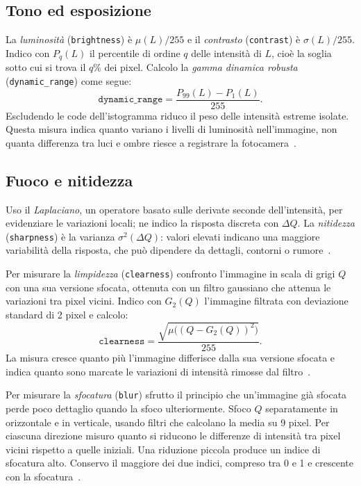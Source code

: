 \subsection{Tono ed esposizione}
\label{subsec:feature-tono}

La \emph{luminosità} (\texttt{brightness}) è $\mu(L)/255$ e il \emph{contrasto} (\texttt{contrast}) è $\sigma(L)/255$. Indico con $P_q(L)$ il percentile di ordine $q$ delle intensità di $L$, cioè la soglia sotto cui si trova il $q\%$ dei pixel. Calcolo la \emph{gamma dinamica robusta} (\texttt{dynamic\_range}) come segue:
\begin{equation}
    \texttt{dynamic\_range}=\frac{P_{99}(L)-P_1(L)}{255}.
    \label{eq:feature-gamma-dinamica}
\end{equation}
Escludendo le code dell'istogramma riduco il peso delle intensità estreme isolate. Questa misura indica quanto variano i livelli di luminosità nell'immagine, non quanta differenza tra luci e ombre riesce a registrare la fotocamera~\cite{1640788}.

\subsection{Fuoco e nitidezza}
\label{subsec:feature-fuoco}

Uso il \emph{Laplaciano}, un operatore basato sulle derivate seconde dell'intensità, per evidenziare le variazioni locali; ne indico la risposta discreta con $\Delta Q$. La \emph{nitidezza} (\texttt{sharpness}) è la varianza $\sigma^2(\Delta Q)$: valori elevati indicano una maggiore variabilità della risposta, che può dipendere da dettagli, contorni o rumore~\cite{903548}.

Per misurare la \emph{limpidezza} (\texttt{clearness}) confronto l'immagine in scala di grigi $Q$ con una sua versione sfocata, ottenuta con un filtro gaussiano che attenua le variazioni tra pixel vicini. Indico con $G_2(Q)$ l'immagine filtrata con deviazione standard di 2 pixel e calcolo:
\begin{equation}
    \texttt{clearness}=\frac{\sqrt{\mu\bigl((Q-G_2(Q))^2\bigr)}}{255}.
    \label{eq:feature-limpidezza}
\end{equation}
La misura cresce quanto più l'immagine differisce dalla sua versione sfocata e indica quanto sono marcate le variazioni di intensità rimosse dal filtro~\cite{PERTUZ20131415}.

Per misurare la \emph{sfocatura} (\texttt{blur}) sfrutto il principio che un'immagine già sfocata perde poco dettaglio quando la sfoco ulteriormente. Sfoco $Q$ separatamente in orizzontale e in verticale, usando filtri che calcolano la media su 9 pixel. Per ciascuna direzione misuro quanto si riducono le differenze di intensità tra pixel vicini rispetto a quelle iniziali. Una riduzione piccola produce un indice di sfocatura alto. Conservo il maggiore dei due indici, compreso tra 0 e 1 e crescente con la sfocatura~\cite{creteroffet:hal-00232709}.

